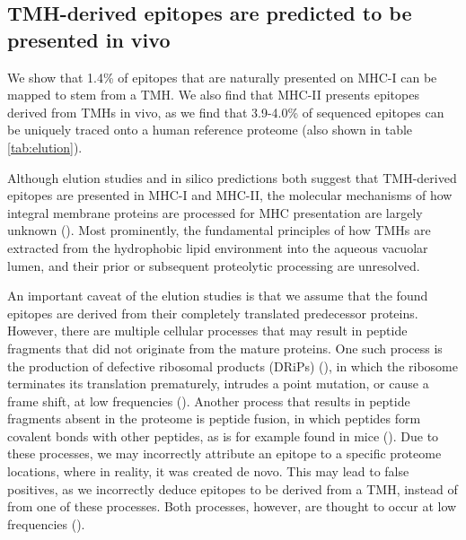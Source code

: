 \subsection{TMH-derived epitopes are predicted to be presented in vivo}

We show that 1.4\% of epitopes that are naturally presented on MHC-I 
can be mapped to stem from a TMH. We also find that MHC-II presents epitopes derived from TMHs in vivo, as we find that 3.9-4.0\% of sequenced epitopes
can be uniquely traced onto a human reference 
proteome (also shown in table \ref{tab:elution}).


Although elution studies and in silico predictions both suggest that TMH-derived epitopes are presented in MHC-I and MHC-II, the molecular mechanisms of how integral membrane proteins are processed for MHC presentation are largely unknown (\cite{bianchi2017}). Most prominently, the fundamental principles of how TMHs are extracted from the  hydrophobic lipid environment into the aqueous vacuolar lumen, and their prior or subsequent proteolytic processing are unresolved.


An important caveat of the elution studies is that we assume that 
the found epitopes are derived from their completely 
translated predecessor proteins.
However, there are multiple cellular processes 
that may result in peptide fragments that did not originate 
from the mature proteins.
One such process is the production of defective ribosomal 
products (DRiPs) (\cite{yewdell1996defective}),
in which the ribosome terminates its translation prematurely,
intrudes a point mutation, 
or cause a frame shift, at low frequencies (\cite{yewdell2011drips}).
Another process that results in peptide fragments absent in the
proteome is peptide fusion, 
in which peptides form covalent bonds with other peptides,
as is for example found in mice (\cite{delong2016pathogenic}).
Due to these processes, we may incorrectly attribute an
epitope to a specific proteome locations, 
where in reality, it was created de novo.
This may lead to false positives, as we incorrectly deduce
epitopes to be derived from a TMH, instead of from one of
these processes. Both processes, however, are thought to
occur at low frequencies (\cite{yewdell2011drips,delong2016pathogenic}).

